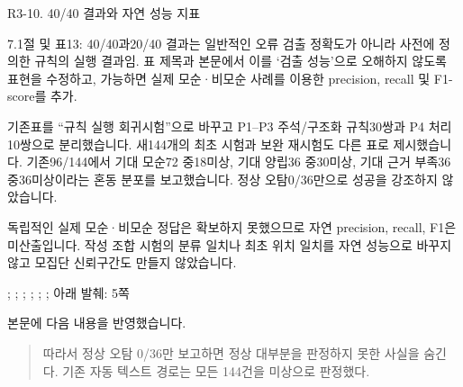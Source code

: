 \begin{reviewitem}{R3-10. 40/40 결과와 자연 성능 지표}

\begin{reviewercomment}

7.1절 및 표13: 40/40과20/40 결과는 일반적인 오류 검출 정확도가 아니라 사전에 정의한 규칙의 실행 결과임. 표 제목과 본문에서 이를 ‘검출 성능’으로 오해하지 않도록 표현을 수정하고, 가능하면 실제 모순·비모순 사례를 이용한 precision, recall 및 F1-score를 추가.

\end{reviewercomment}

\begin{authorresponse}

기존표를 ``규칙 실행 회귀시험''으로 바꾸고 P1–P3 주석/구조화 규칙30쌍과 P4 처리10쌍으로 분리했습니다. 새144개의 최초 시험과 보완 재시험도 다른 표로 제시했습니다. 기존96/144에서 기대 모순72 중18미상, 기대 양립36 중30미상, 기대 근거 부족36 중36미상이라는 혼동 분포를 보고했습니다. 정상 오탐0/36만으로 성공을 강조하지 않았습니다.

독립적인 실제 모순·비모순 정답은 확보하지 못했으므로 자연 precision, recall, F1은 미산출입니다. 작성 조합 시험의 분류 일치나 최초 위치 일치를 자연 성능으로 바꾸지 않고 모집단 신뢰구간도 만들지 않았습니다.

\end{authorresponse}

\begin{manuscriptrevision}{; ; ; ; ; ; 아래 발췌: 5쪽}

본문에 다음 내용을 반영했습니다.

\begin{quote}

따라서 정상 오탐 0/36만 보고하면 정상 대부분을 판정하지 못한 사실을 숨긴다. 기존 자동 텍스트 경로는 모든 144건을 미상으로 판정했다.

\end{quote}

\end{manuscriptrevision}

\end{reviewitem}

\clearpage

